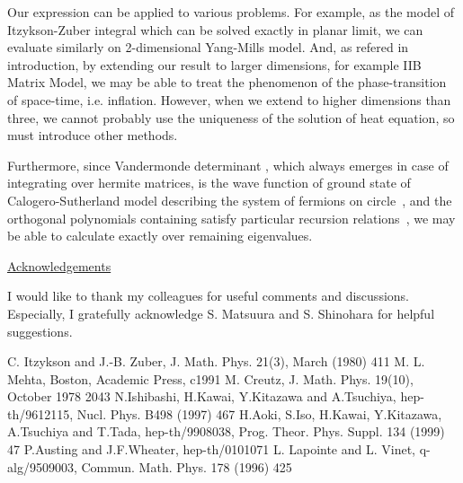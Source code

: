 \documentclass[a4paper,12pt]{article}
\begin{document}
Our expression can be applied to various problems. For example, as the model of Itzykson-Zuber integral which can be solved exactly in \coordHE{} planar limit, we can evaluate similarly on 2-dimensional Yang-Mills model. And, as refered in introduction, by extending our result to larger dimensions, for example IIB Matrix Model, we may be able to treat the phenomenon of the phase-transition of space-time, i.e. inflation. However, when we extend to higher dimensions than three, we cannot probably use the uniqueness of the solution of heat equation, so must introduce other methods.

Furthermore, since Vandermonde determinant \coordHE{}, which always emerges in case of integrating over hermite matrices, is the wave function of ground state of Calogero-Sutherland model describing the system of fermions on circle~\cite{cs}, and the orthogonal polynomials containing \coordHE{} satisfy particular recursion relations~\cite{itz}, we may be able to calculate exactly over remaining eigenvalues.

\vskip 1cm

\noindent \underline{ Acknowledgements }

\vskip 0.2cm

I would like to thank my colleagues for useful comments and discussions. Especially, I gratefully acknowledge S. Matsuura and S. Shinohara for helpful suggestions.

\begin{thebibliography}{nn}
\addtolength{\itemsep}{-5pt}
 C. Itzykson and J.-B. Zuber, J. Math. Phys. 21(3), March (1980) 411
 M. L. Mehta, Boston, Academic Press, c1991
 M. Creutz, J. Math. Phys. 19(10), October 1978 2043
 N.Ishibashi, H.Kawai, Y.Kitazawa and A.Tsuchiya, hep-th/9612115, Nucl. Phys. B498 (1997) 467
 H.Aoki, S.Iso, H.Kawai, Y.Kitazawa, A.Tsuchiya and T.Tada, hep-th/9908038, Prog. Theor. Phys. Suppl. 134 (1999) 47
 P.Austing and J.F.Wheater, hep-th/0101071
 L. Lapointe and L. Vinet, q-alg/9509003, Commun. Math. Phys. 178 (1996) 425
\end{thebibliography}
\end{document}
